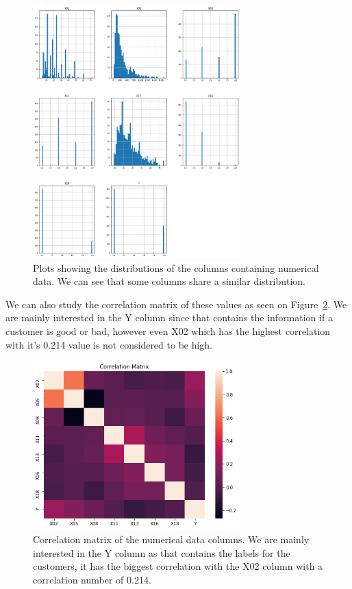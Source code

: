 \documentclass[runningheads]{llncs}
\begin{document}
\begin{figure}[h]
\includegraphics[width=8cm]{images/num_data.png}
\centering
\caption{Plots showing the distributions of the columns containing numerical data. We can see that some columns share a similar distribution.}
\label{num_data}
\end{figure}

We can also study the correlation matrix of these values as seen on Figure~\ref{correllation}. We are mainly interested in the Y column since that contains the information if a customer is good or bad, however even X02 which has the highest correlation with it's 0.214 value is not considered to be high.

\begin{figure}
\includegraphics[width=8cm]{images/correllation.png}
\centering
\caption{Correlation matrix of the numerical data columns. We are mainly interested in the Y column as that contains the labels for the customers, it has the biggest correlation with the X02 column with a correlation number of 0.214.}
\label{correllation}
\end{figure}
\end{document}
